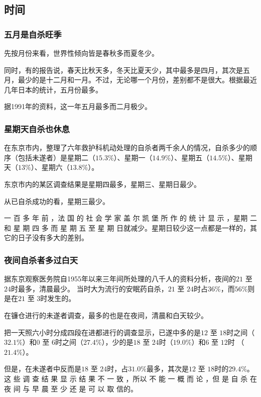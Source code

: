 \documentclass[UTF8]{ctexart}
\begin{document}
\subsection{时间}

\subsubsection*{五月是自杀旺季}

先按月份来看，世界性倾向皆是春秋多而夏冬少。

同时，有的报告说，春天比秋天多，冬天比夏天少，其中最多是四月，其次是五月，最少的是十二月和一月。不过，无论哪一个月份，差别都不是很大。根据最近几年日本的统计，五月份最多。

据1991年的资料，这一年五月最多而二月极少。

\subsubsection*{星期天自杀也休息}

在东京市内，整理了六年救护科机动处理的自杀者两千余人的情况，自杀多少的顺序（包括未遂者）是星期二（$15.3\%$）、星期一（$14.9\%$）、星期五（$14.5\%$）、星期天（$13\%$）、星期六（$13.8\%$）。

东京市内的某区调查结果是星期四最多，星期三、星期日最少。

从已自杀成功的看，星期三最少。

一 百 多 年 前 ，法 国 的 社 会 学 家 盖 尔 凯 堡 所 作 的 统 计 显 示 ，星期 二 和 星 期 四 多 而 星 期 五 至 星 期 日就减少。星期日较少这一点都是一样的，其它的日子没有多大的差别。

\subsubsection*{夜间自杀者多过白天}

据东京观察医务院自1955年以来三年间所处理的八千人的资料分析，夜间的$21$ 至 $24$时最多，清晨最少。
当时大为流行的安眠药自杀，$21$ 至 $24$时占$36\%$，而$56\%$则是在$21$ 至 $3$时发生的。

在镰仓进行的未遂者调查，最多的也是在夜间，清晨和白天较少。

把一天照六小时分成四段在进都进行的调查显示，已遂中多的是$12$ 至 $18$时之间（$32.1\%$）和$0$ 至 $6$时之间（$27.4\%$），少的是$18$ 至 $24$时（$19.0\%$）和$6$ 至 $12$时 （$21.4\%$）。

但是，在未遂者中反而是$18$ 至 $24$时，占$31.0\%$最多，其次是$12$ 至 $18$时的$29.4\%$。 这 些 调 查 结 果 显 示 结 果 不 一 致 ，所以 不 能 一 概 而 论 ，但 是 自 杀 在 夜 间 与 早 晨 至 少 还 是 可 以 取 信的。
\end{document}
